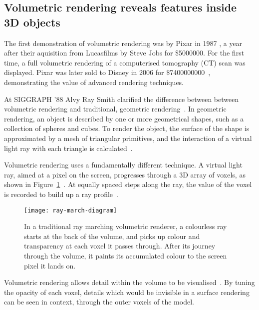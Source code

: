 \subsection{Volumetric rendering reveals features inside 3D objects} \label{sec:volumerendering}
The first demonstration of volumetric rendering was by Pixar in 1987 \cite{smith1987volume}, a year after their aquisition from Lucasfilms by Steve Jobs for \$\num{5000000}.
For the first time, a full volumetric rendering of a computerised tomography (CT) scan was displayed.
Pixar was later sold to Disney in 2006 for \$\num{7400000000}~\cite{pixar2007story, pixar2018our}, demonstrating the value of advanced rendering techniques. 

At SIGGRAPH '88 Alvy Ray Smith clarified the difference between between volumetric rendering and traditional, geometric rendering~\cite{siggraph1988panel}.
In geometric rendering, an object is described by one or more geometrical shapes, such as a collection of spheres and cubes.
To render the object, the surface of the shape is approximated by a mesh of triangular primitives, and the interaction of a virtual light ray with each triangle is calculated~\cite{buss20033d}. 

Volumetric rendering uses a fundamentally different technique.
A virtual light ray, aimed at a pixel on the screen, progresses through a 3D array of voxels, as shown in Figure~\ref{fig:raymarch-diagram}~\cite{tuy1984direct}.
At equally spaced steps along the ray, the value of the voxel is recorded to build up a ray profile~\cite{levoy1988display}.

\begin{figure}[htbp!]
\centering
\texttt{[image: ray-march-diagram]}
\caption[FPBioimage: Raymarching facilitates volumetric rendering of 3D data]{In a traditional ray marching volumetric renderer, a colourless ray starts at the back of the volume, and picks up colour and transparency at each voxel it passes through. After its journey through the volume, it paints its accumulated colour to the screen pixel it lands on. }
\label{fig:raymarch-diagram}
\end{figure}

Volumetric rendering allows detail within the volume to be visualised~\cite{drebin1988volume}. 
By tuning the opacity of each voxel, details which would be invisible in a surface rendering can be seen in context, through the outer voxels of the model. 

